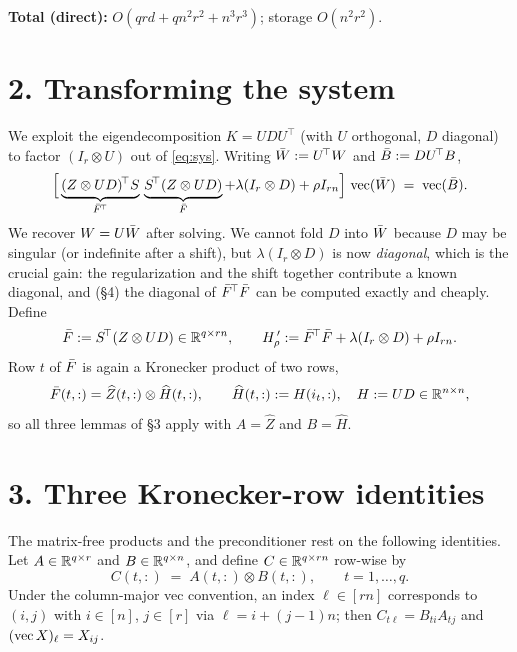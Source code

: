 \documentclass[11pt]{article}
\begin{document}
\medskip
\noindent\textbf{Total (direct):} $O(qrd+qn^2r^2+n^3r^3)$; storage $O(n^2r^2)$.

\section*{2. Transforming the system}

We exploit the eigendecomposition $K=UDU^{\!\top}$ (with $U$ orthogonal, $D$
diagonal) to factor $(I_r\otimes U)$ out of \eqref{eq:sys}. Writing
$\bar W:=U^{\!\top}W$ and $\bar B:=DU^{\!\top}B$,
\begin{equation}\label{eq:transformed}
  \Bigl[\,\underbrace{(Z\otimes UD)^{\!\top}S}_{\bar F^{\!\top}}\,
          \underbrace{S^{\!\top}(Z\otimes UD)}_{\bar F}
        + \lambda(I_r\otimes D) + \rho I_{rn}\Bigr]\,\operatorname{vec}(\bar W)
   \;=\; \operatorname{vec}(\bar B).
\end{equation}
We recover $W=U\bar W$ after solving. We cannot fold $D$ into $\bar W$ because $D$
may be singular (or indefinite after a shift), but $\lambda(I_r\otimes D)$ is
now \emph{diagonal}, which is the crucial gain: the regularization and the
shift together contribute a known diagonal, and (\S4) the diagonal of
$\bar F^{\!\top}\bar F$ can be computed exactly and cheaply. Define
\[
  \bar F := S^{\!\top}(Z\otimes UD)\in\mathbb{R}^{q\times rn},
  \qquad H_\rho^{\,\prime}:=\bar F^{\!\top}\bar F+\lambda(I_r\otimes D)+\rho I_{rn}.
\]
Row $t$ of $\bar F$ is again a Kronecker product of two rows,
\begin{equation}\label{eq:Fbar-rows}
  \bar F(t,:)=\widehat Z(t,:)\otimes \widehat H(t,:),
  \qquad \widehat H(t,:):=H(i_t,:),\quad H:=UD\in\mathbb{R}^{n\times n},
\end{equation}
so all three lemmas of \S3 apply with $A=\widehat Z$ and $B=\widehat H$.

\section*{3. Three Kronecker-row identities}

The matrix-free products and the preconditioner rest on the following
identities. Let $A\in\mathbb{R}^{q\times r}$ and $B\in\mathbb{R}^{q\times n}$, and define
$C\in\mathbb{R}^{q\times rn}$ row-wise by
\begin{equation}\label{eq:Crows}
  C(t,:) \;=\; A(t,:)\otimes B(t,:),\qquad t=1,\dots,q.
\end{equation}
Under the column-major vec convention, an index $\ell\in[rn]$ corresponds to
$(i,j)$ with $i\in[n]$, $j\in[r]$ via $\ell=i+(j-1)n$; then
$C_{t\ell}=B_{ti}A_{tj}$ and $(\operatorname{vec} X)_\ell=X_{ij}$.
\end{document}

